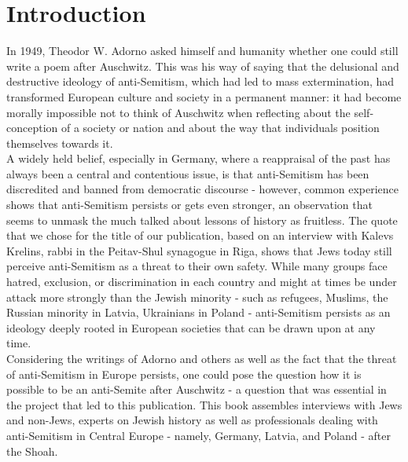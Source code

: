 \section{Introduction}
\vspace*{3em}
In 1949, Theodor W. Adorno asked himself and humanity whether one could still write a poem after Auschwitz. This was his way of saying that the delusional and destructive ideology of anti-Semitism, which had led to mass extermination, had transformed European culture and society in a permanent manner: it had become morally impossible not to think of Auschwitz when reflecting about the self-conception of a society or nation and about the way that individuals position themselves towards it.\\
A widely held belief, especially in Germany, where a reappraisal of the past has always been a central and contentious issue, is that anti-Semitism has been discredited and banned from democratic discourse - however, common experience shows that anti-Semitism persists or gets even stronger, an observation that seems to unmask the much talked about lessons of history as fruitless. The quote that we chose for the title of our publication, based on an interview with Kalevs Krelins, rabbi in the Peitav-Shul synagogue in Riga, shows that Jews today still perceive anti-Semitism as a threat to their own safety. While many groups face hatred, exclusion, or discrimination in each country and might at times be under attack more strongly than the Jewish minority - such as refugees, Muslims, the Russian minority in Latvia, Ukrainians in Poland - anti-Semitism persists as an ideology deeply rooted in European societies that can be drawn upon at any time.\\
Considering the writings of Adorno and others as well as the fact that the threat of anti-Semitism in Europe persists, one could pose the question how it is possible to be an anti-Semite after Auschwitz - a question that was essential in the project that led to this publication. This book assembles interviews with Jews and non-Jews, experts on Jewish history as well as professionals dealing with anti-Semitism in Central Europe - namely, Germany, Latvia, and Poland - after the Shoah.
